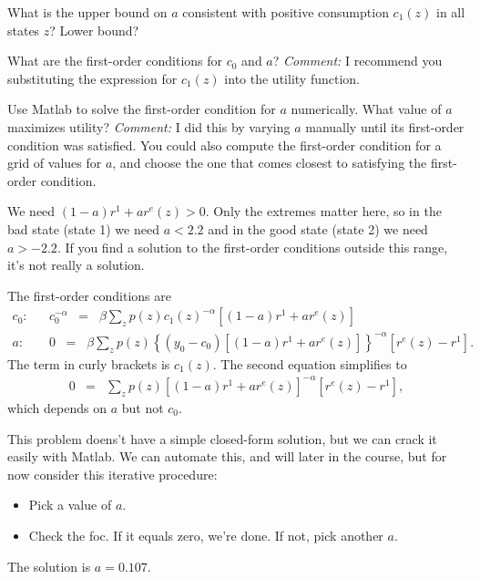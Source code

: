 \documentclass[11pt]{exam}
\begin{document}
\begin{questions}
\begin{parts}
\item What is the upper bound on $a$ consistent with positive consumption
$c_1(z)$ in all states $z$?
Lower bound?
\item What are the first-order conditions for $c_0$ and $a$?
{\it Comment:\/}  I recommend you substituting the expression for $c_1(z)$ into the utility function.
\item Use Matlab to solve the first-order condition for $a$ numerically.
What value of $a$ maximizes utility?
{\it Comment:\/}  I did this
by varying $a$ manually until its first-order condition was satisfied.
You could also compute the first-order condition for a grid of values for $a$,
and choose the one that comes closest to satisfying the first-order condition.
\end{parts}

\begin{solution}
\begin{parts}
\item We need $(1-a)r^1 + a r^e(z) > 0 $.
Only the extremes matter here, so in the bad state (state 1)
we need $ a < 2.2$ and in the good state (state 2)
we need $a > -2.2$.
If you find a solution to the first-order conditions outside this range,
it's not really a solution.

\item The first-order conditions are
\begin{eqnarray*}
    c_0:  &&  c_0^{-\alpha} \;\;=\;\; \beta \sum_z p(z)
            c_1(z)^{-\alpha} [ (1-a)r^1 + a r^e(z)] \\
    a:    && 0 \;\;=\;\; \beta \sum_z p(z) \left\{(y_0-c_0)[(1-a) r^1 + a r^e(z)]\right\}^{-\alpha}
            [r^e(z) - r^1 ]  .
\end{eqnarray*}
The term in curly brackets is $c_1(z)$.
The second equation simplifies to
\begin{eqnarray*}
    0 &=& \sum_z p(z) [ (1-a)r^1 + a r^e(z)]^{-\alpha} [r^e(z) - r^1 ] ,
\end{eqnarray*}
which depends on $a$ but not $c_0$.

\item This problem doens't have a simple closed-form solution,
but we can crack it easily with Matlab.
We can automate this, and will later in the course,
but for now consider this iterative procedure:
\begin{itemize}
\item Pick a value of $a$.
\item Check the foc.  If it equals zero, we're done. If not, pick another $a$.
\end{itemize}
The solution is $a=0.107$.
\end{parts}
\end{solution}

\end{questions}


\end{document}
